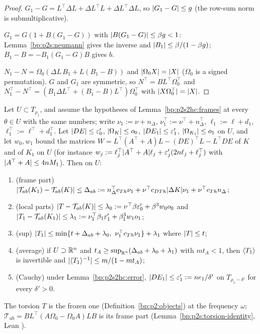 \begin{proof}
\label{step:p2s2hc:fr-g}
$G_1-G=L^\top\Delta L+\Delta L^\top L+\Delta L^\top\Delta L$, so $\lvert G_1-G\rvert\le g$ (the row-sum norm is submultiplicative).

\label{step:p2s2hc:fr-n}
$G_1=G(1+B(G_1-G))$ with $\lvert B(G_1-G)\rvert\le\beta g<1$: Lemma~\ref{bp:p2s:neumann} gives the inverse and $\lvert B_1\rvert\le\beta/(1-\beta g)$;
$B_1-B=-B_1(G_1-G)B$ gives $b$.

\label{step:p2s2hc:fr-nf}
$N_1-N=\Omega_0(\Delta L\,B_1+L(B_1-B))$ and $\lvert \Omega_0X\rvert=\lvert X\rvert$ ($\Omega_0$ is a signed permutation). $G$ and $G_1$ are symmetric, so $N^\top=BL^\top\Omega_0^\top$
and $N_1^\top-N^\top=(B_1\Delta L^\top+(B_1-B)L^\top)\Omega_0^\top$ with $\lvert X\Omega_0^\top\rvert=\lvert X\rvert$.
\end{proof}

\begin{lemma}\label{bp:p2s2hc:torsion}
Let $U\subset T_{\rho_1}$, and assume the hypotheses of Lemma~\ref{bp:p2s2hc:frames} at every $\theta\in U$ with the same numbers; write $\nu_1:=\nu+n_\Delta$,
$\nu_1^\top:=\nu^\top+n_\Delta^\top$, $\ell_1:=\ell+d_1$, $\ell_1^\top:=\ell^\top+d_1^\top$. Let $\lvert DE\rvert\le\varepsilon_0'$, $\lvert \Omega_K\rvert\le o_0$, $\lvert DE_1\rvert\le\varepsilon_1'$, $\lvert \Omega_{K_1}\rvert\le o_1$
on $U$, and let $w_0,w_1$ bound the matrices $W=L^\top(A^\top+A)L-(DE)^\top L-L^\top DE$ of $K$ and of $K_1$ on $U$ (for instance
$w_j:=\ell_j^\top\lvert A^\top+A\rvert\ell_j+\varepsilon_j'(2n\ell_j+\ell_j^\top)$ with $\lvert A^\top+A\rvert\le4nM_1$). Then on $U$:
\begin{enumerate}[label=(\alph*)]
\item (frame part) $\lvert \mathcal T_{ab}(K_1)-\mathcal T_{ab}(K)\rvert\le\Delta_{ab}:=n_\Delta^\top c_{Th}\nu_1+\nu^\top c_{DTh}\lvert \Delta K\rvert\nu_1+\nu^\top c_{Th}n_\Delta$;
\item (local parts) $\lvert T-\mathcal T_{ab}(K)\rvert\le\lambda_0:=\nu^\top\beta\varepsilon_0'+\beta^3w_0o_0$ and $\lvert T_1-\mathcal T_{ab}(K_1)\rvert\le\lambda_1:=\nu_1^\top\beta_1\varepsilon_1'+\beta_1^3w_1o_1$;
\item (sup) $\abs{T_1}\le\min\{t+\Delta_{ab}+\lambda_0,\ \nu_1^\top c_{Th}\nu_1\}+\lambda_1$ where $\lvert T\rvert\le t$;
\item (average) if $U\supset\mathbb{R}^n$ and $t_A\ge\sup_{\mathbb{R}^n}(\Delta_{ab}+\lambda_0+\lambda_1)$ with $mt_A<1$, then $\langle T_1\rangle$ is invertible and
  $\lvert \langle T_1\rangle^{-1}\rvert\le m/(1-mt_A)$;
\item (Cauchy) under Lemma~\ref{bp:p2s2hc:error}, $\lvert DE_1\rvert\le\varepsilon_1':=ne_1/\delta'$ on $T_{\rho_1-\delta'}$ for every $\delta'>0$.
\end{enumerate}
The torsion $T$ is the frozen one (Definition~\ref{bp:p2:objects}) at the frequency $\omega$; $\mathcal T_{ab}=BL^\top(A\Omega_0-\Omega_0A)LB$ is its frame part
(Lemma~\ref{bp:p2s:torsion-identity}, Lean ).
\end{lemma}

